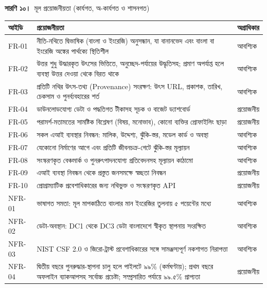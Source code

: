 \documentclass[border=10pt]{standalone}
\begin{document}
\begin{minipage}{17cm}
{\large\bfseries সারণি ১০।}\ {\large মূল প্রয়োজনীয়তা (কার্যগত, অ-কার্যগত ও শাসনগত)}\par\vspace{7pt}
\small
{}
\begin{tabularx}{\linewidth}{@{}>{\hsize=0.422\hsize\raggedright\arraybackslash}X>{\hsize=2.156\hsize\raggedright\arraybackslash}X>{\hsize=0.422\hsize\raggedright\arraybackslash}X@{}}
\arrayrulecolor{bapilrule}\toprule
\rowcolor{white}\textbf{আইডি} & \textbf{প্রয়োজনীয়তা} & \textbf{অগ্রাধিকার} \\
\midrule
FR-01 & নীতি-নথিতে দ্বিভাষিক (বাংলা ও ইংরেজি) অনুসন্ধান, যা বানানভেদ এবং বাংলা বা ইংরেজি অঙ্কের পার্থক্যে স্থিতিশীল & আবশ্যিক \\
FR-02 & উত্তর শুধু উদ্ধারকৃত উৎসের ভিত্তিতে, অনুচ্ছেদ-পর্যায়ের উদ্ধৃতিসহ; প্রমাণ অপর্যাপ্ত হলে ব্যবস্থা উত্তর দেওয়া থেকে বিরত থাকে & আবশ্যিক \\
FR-03 & প্রতিটি নথির উৎস-তথ্য (Provenance) সংরক্ষণ: উৎস URL, প্রকাশক, তারিখ, চেকসাম ও পুনর্ব্যবহারের শর্ত & আবশ্যিক \\
FR-04 & ডাউনলোডযোগ্য ডেটা ও পদ্ধতিগত টীকাসহ সূচক ও বাজেট ড্যাশবোর্ড & প্রয়োজনীয় \\
FR-05 & পরামর্শ-মতামতের সামষ্টিক বিশ্লেষণ (বিষয়, মনোভাব), কোনো ব্যক্তির প্রোফাইলিং ছাড়া & প্রয়োজনীয় \\
FR-06 & সকল এআই ব্যবস্থার নিবন্ধন: মালিক, উদ্দেশ্য, ঝুঁকি-স্তর, মডেল কার্ড ও অবস্থা & আবশ্যিক \\
FR-07 & যেকোনো নির্মাণের আগে এবং প্রতিটি জীবনচক্র-গেটে ঝুঁকি-স্তর মূল্যায়ন & আবশ্যিক \\
FR-08 & সংস্করণকৃত বেঞ্চমার্ক ও পুনরুৎপাদনযোগ্য প্রতিবেদনসহ মূল্যায়ন কাঠামো & আবশ্যিক \\
FR-09 & এআই ব্যবস্থা নিবন্ধন থেকে প্রস্তুত জনসমক্ষে স্বচ্ছতা নিবন্ধন & প্রয়োজনীয় \\
FR-10 & প্রোগ্রাম্যাটিক প্রবেশাধিকারের জন্য নথিভুক্ত ও সংস্করণকৃত API & প্রয়োজনীয় \\
NFR-01 & ভাষাগত সমতা: মূল মাপকাঠিতে বাংলার মান ইংরেজির তুলনায় ৫ পয়েন্টের মধ্যে & আবশ্যিক \\
NFR-02 & ডেটা-অবস্থান: DC1 থেকে DC3 ডেটা বাংলাদেশে স্বীকৃত স্থাপনায় সংরক্ষিত & আবশ্যিক \\
NFR-03 & NIST CSF 2.0 ও জিরো-ট্রাস্ট প্রবেশাধিকারের সঙ্গে সামঞ্জস্যপূর্ণ নকশাগত নিরাপত্তা & আবশ্যিক \\
NFR-04 & দ্বিতীয় বছরে পুনরুদ্ধার-স্থাপনা চালু হলে পাইলটে ৯৯\% (কর্মঘণ্টায়); প্রথম বছরে অফলাইন ব্যাকআপসহ সর্বোচ্চ প্রচেষ্টা; সম্প্রসারিত পর্যায়ে ৯৯.৫\% প্রাপ্যতা & প্রয়োজনীয় \\

\end{tabularx}
\end{minipage}
\end{document}
